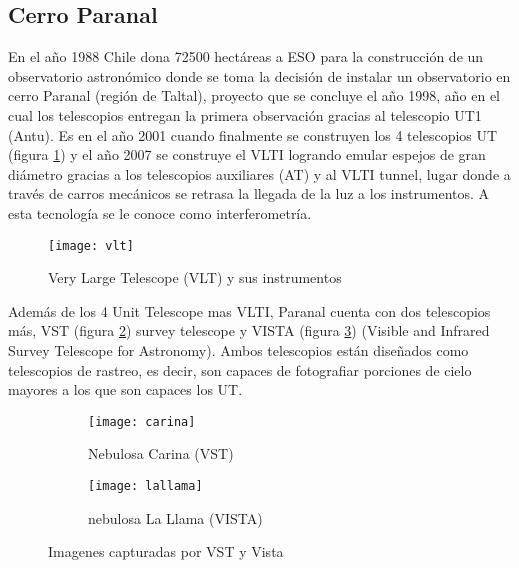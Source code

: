 		\subsection{Cerro Paranal}
			En el año 1988 Chile dona 72500 hectáreas a ESO para la construcción de un observatorio astronómico donde se toma la decisión de instalar un observatorio en cerro Paranal (región de Taltal), proyecto que se concluye el año 1998, año en el cual los telescopios entregan la primera observación gracias al telescopio UT1 (Antu). Es en el año 2001 cuando finalmente se construyen los 4 telescopios UT (figura \ref{fig:VLT}) y el año 2007 se construye el VLTI logrando emular espejos de gran diámetro gracias a los telescopios auxiliares (AT) y al VLTI tunnel, lugar donde a través de carros mecánicos se retrasa la llegada de la luz a los instrumentos. A esta tecnología se le conoce como interferometría.
			\begin{figure}
				\centering
				\texttt{[image: vlt]}
				\caption{Very Large Telescope (VLT) y sus instrumentos}
				\label{fig:VLT}
			\end{figure}
			\newpage
			Además de los 4 Unit Telescope mas VLTI, Paranal cuenta con dos 	telescopios más, VST (figura \ref{fig:carina}) survey telescope y VISTA (figura \ref{fig:lallama}) (Visible and Infrared Survey Telescope for Astronomy). Ambos telescopios están diseñados como telescopios de rastreo, es decir, son capaces de fotografiar porciones de cielo mayores a los que son capaces los UT.
			
			
			\begin{figure}[H]
				\centering
				\begin{subfigure}[b]{0.45\textwidth}
					\texttt{[image: carina]}
					\caption{Nebulosa Carina (VST)}
					\label{fig:carina}
				\end{subfigure}			    
			    \begin{subfigure}[b]{0.45\textwidth}
			    	\texttt{[image: lallama]}
			    	\caption{nebulosa La Llama (VISTA)}
			    	\label{fig:lallama}
			    \end{subfigure}
		    \caption{Imagenes capturadas por VST y Vista}
		    \label{fig:vstvistaimages}
		    \end{figure}
